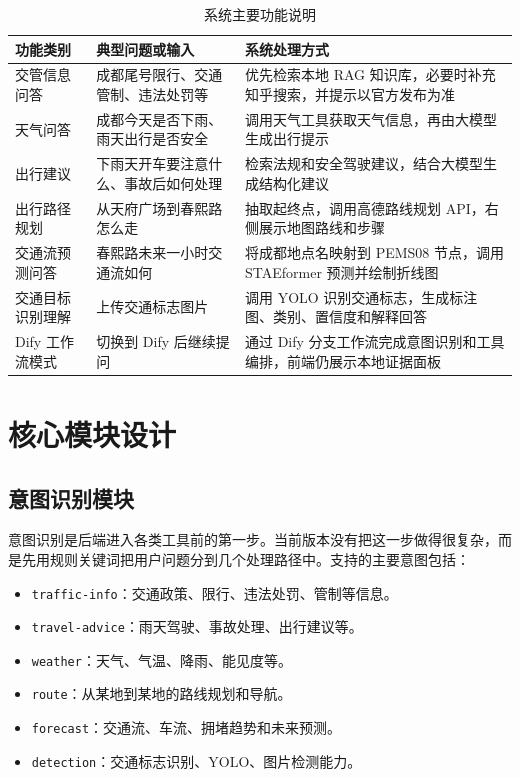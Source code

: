 \documentclass[bwprint]{report}
\begin{document}
\begin{table}[H]
    \caption{系统主要功能说明}
    \label{tab:system-functions}
    \centering
    \small
    \begin{tabular}{p{}p{}p{}}
        \toprule[1.5pt]
        功能类别 & 典型问题或输入 & 系统处理方式 \\
        \midrule[1pt]
        交管信息问答 & 成都尾号限行、交通管制、违法处罚等 & 优先检索本地 RAG 知识库，必要时补充知乎搜索，并提示以官方发布为准 \\
        天气问答 & 成都今天是否下雨、雨天出行是否安全 & 调用天气工具获取天气信息，再由大模型生成出行提示 \\
        出行建议 & 下雨天开车要注意什么、事故后如何处理 & 检索法规和安全驾驶建议，结合大模型生成结构化建议 \\
        出行路径规划 & 从天府广场到春熙路怎么走 & 抽取起终点，调用高德路线规划 API，右侧展示地图路线和步骤 \\
        交通流预测问答 & 春熙路未来一小时交通流如何 & 将成都地点名映射到 PEMS08 节点，调用 STAEformer 预测并绘制折线图 \\
        交通目标识别理解 & 上传交通标志图片 & 调用 YOLO 识别交通标志，生成标注图、类别、置信度和解释回答 \\
        Dify 工作流模式 & 切换到 Dify 后继续提问 & 通过 Dify 分支工作流完成意图识别和工具编排，前端仍展示本地证据面板 \\
        \bottomrule[1.5pt]
    \end{tabular}
\end{table}

\section{核心模块设计}
\subsection{意图识别模块}
意图识别是后端进入各类工具前的第一步。当前版本没有把这一步做得很复杂，而是先用规则关键词把用户问题分到几个处理路径中。支持的主要意图包括：
\begin{itemize}
    \item \texttt{traffic-info}：交通政策、限行、违法处罚、管制等信息。
    \item \texttt{travel-advice}：雨天驾驶、事故处理、出行建议等。
    \item \texttt{weather}：天气、气温、降雨、能见度等。
    \item \texttt{route}：从某地到某地的路线规划和导航。
    \item \texttt{forecast}：交通流、车流、拥堵趋势和未来预测。
    \item \texttt{detection}：交通标志识别、YOLO、图片检测能力。
\end{itemize}
\end{document}
